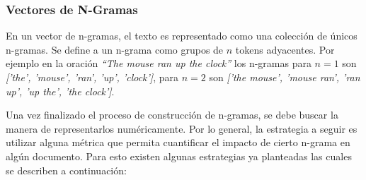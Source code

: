 \subsubsection{Vectores de N-Gramas}
    En un vector de n-gramas, el texto es representado como una colección de únicos n-gramas. Se define a un n-grama como grupos de $n$ tokens adyacentes. Por ejemplo en la oración \textit{``The mouse ran up the clock''} los n-gramas para $n=1$ son \textit{['the', 'mouse', 'ran', 'up', 'clock']}, para $n=2$ son \textit{['the mouse', 'mouse ran', 'ran up', 'up the', 'the clock']}.
    
    Una vez finalizado el proceso de construcción de n-gramas, se debe buscar la manera de representarlos numéricamente. Por lo general, la estrategia a seguir es utilizar alguna métrica que permita cuantificar el impacto de cierto n-grama en algún documento. Para esto existen algunas estrategias ya planteadas las cuales se describen a continuación:

